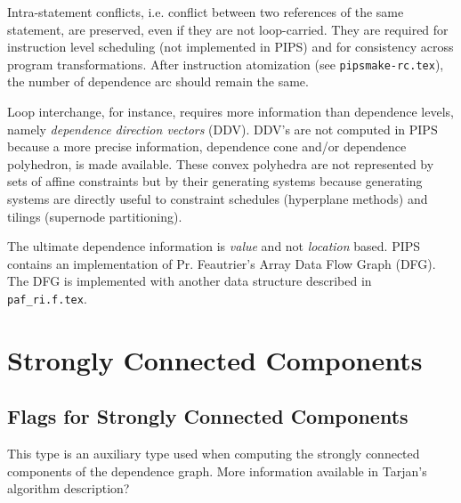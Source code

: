 Intra-statement conflicts, i.e. conflict between two references of the
same statement, are preserved, even if they are not loop-carried. They
are required for instruction level scheduling (not implemented in PIPS)
and for consistency across program transformations. After instruction
atomization (see \verb/pipsmake-rc.tex/), the number of dependence arc
should remain the same.

Loop interchange, for instance, requires more information than
dependence levels, namely {\em dependence direction vectors}
(DDV). DDV's are not computed in PIPS because a more precise
information, dependence cone and/or dependence polyhedron, is made
available. These convex polyhedra are not represented by sets of affine
constraints but by their generating systems because generating systems
are directly useful to constraint schedules (hyperplane methods) and
tilings (supernode partitioning).

The ultimate dependence information is {\em value} and not {\em
location} based. PIPS contains an implementation of Pr. Feautrier's
Array Data Flow Graph (DFG). The DFG is implemented with another data
structure described in \verb/paf_ri.f.tex/.

\iffalse
Le domaine co^ne de'finit une approximation polye'drique de l'ensemble
des de'pendances porte'es par un arc. Plusieurs types d'approximation
sont possibles: les niveaux de de'pendance, les vecteurs de direction de
de'pendance, les syste`mes ge'ne'rateurs (aussi
connus sous le nom de {\em co^ne de de'pendance}) et le me'canisme
du {\em Data Flow Graph} n'est pas imple'mente' avec cette structure
de donne'es mais avec \verb|paf_ri|.
\fi

\iffalse
Le niveau d'une de'pendance d\'ecrivent le nombre de boucles englobantes
concerne\'ees.  ``{generating\_system}'' est la r\'epresentation de
system generateur.
\fi

\section{Strongly Connected Components}

\subsection{Flags for Strongly Connected Components}

{}

This type is an auxiliary type used when computing the strongly
connected components of the dependence graph. More information
available in Tarjan's algorithm description?

